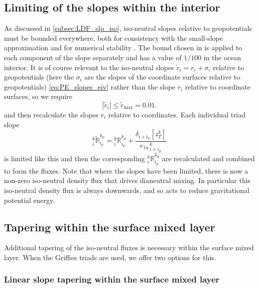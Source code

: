 \documentclass[../main/NEMO_manual]{subfiles}
\begin{document}
\subsection{ Limiting of the slopes within the interior}
\label{sec:limit}

As discussed in \autoref{subsec:LDF_slp_iso},
iso-neutral slopes relative to geopotentials must be bounded everywhere,
both for consistency with the small-slope approximation and for numerical stability \citep{Cox1987, Griffies_Bk04}.
The bound chosen in \NEMO is applied to each component of the slope separately and
has a value of $1/100$ in the ocean interior.
It is of course relevant to the iso-neutral slopes $\tilde{r}_i=r_i+\sigma_i$ relative to geopotentials
(here the $\sigma_i$ are the slopes of the coordinate surfaces relative to geopotentials)
\autoref{eq:PE_slopes_eiv} rather than the slope $r_i$ relative to coordinate surfaces, so we require
\[
  |\tilde{r}_i|\leq \tilde{r}_\mathrm{max}=0.01.
\]
and then recalculate the slopes $r_i$ relative to coordinates.
Each individual triad slope
\begin{equation}
  \label{eq:Rtilde}
  _i^k\tilde{\mathbb{R}}_{i_p}^{k_p} = {}_i^k\mathbb{R}_{i_p}^{k_p}  + \frac{\delta_{i+i_p}[z_T^k]}{{e_{1u}}_{\,i + i_p}^{\,k}}
\end{equation}
is limited like this and then the corresponding $_i^k\mathbb{R}_{i_p}^{k_p} $ are recalculated and
combined to form the fluxes.
Note that where the slopes have been limited, there is now a non-zero iso-neutral density flux that
drives dianeutral mixing.
In particular this iso-neutral density flux is always downwards,
and so acts to reduce gravitational potential energy.

\subsection{Tapering within the surface mixed layer}
\label{sec:taper}

Additional tapering of the iso-neutral fluxes is necessary within the surface mixed layer.
When the Griffies triads are used, we offer two options for this.

\subsubsection{Linear slope tapering within the surface mixed layer}
\label{sec:lintaper}
\end{document}

